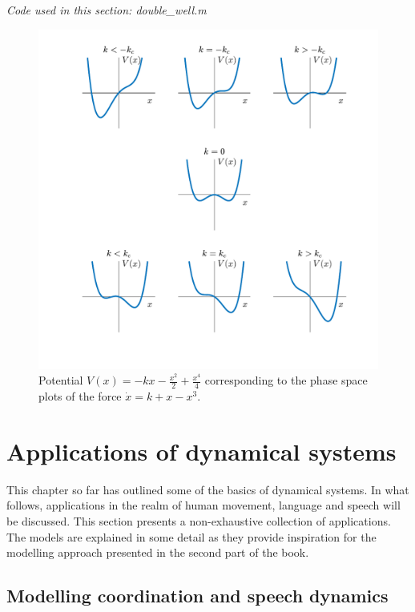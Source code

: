 \medskip\noindent \textit{Code used in this section: double\_well.m}

\begin{figure}[hp]
\begin{center}
\includegraphics[width=\textwidth]{figures/ch3/double_well_potential.pdf}
\caption{Potential $V(x) = - kx - \frac{x^2}{2} + \frac{x^4}{4}$ corresponding to the phase space plots of the force $\dot{x} = k + x - x^3$.}
\label{fig:double_well_potential}
\end{center}
\end{figure}

\section{Applications of dynamical systems}

This chapter so far has outlined some of the basics of dynamical systems. In what follows, applications in the realm of human movement, language and speech will be discussed. This section presents a non-exhaustive collection of applications. The models are explained in some detail as they provide inspiration for the modelling approach presented in the second part of the book.

\subsection{Modelling coordination and speech dynamics}

